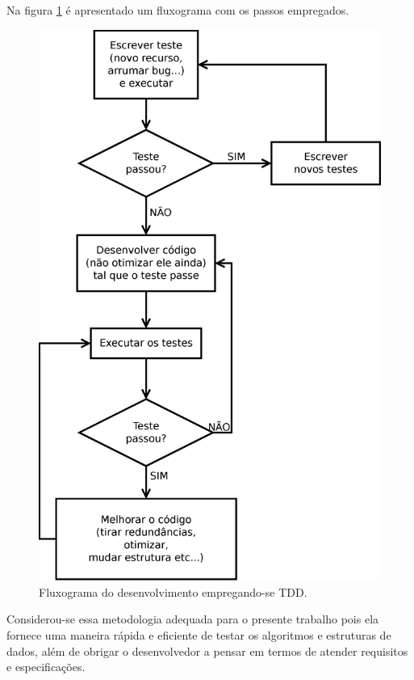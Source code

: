 Na figura \ref{fig:tdd_flow} é apresentado um fluxograma com os passos empregados.

\begin{figure}[H]
  \centering
  \includegraphics[scale=0.55]{images/diagrams/TDD_diagram}
  \caption{Fluxograma do desenvolvimento empregando-se TDD.}
  \label{fig:tdd_flow}
\end{figure}

Considerou-se essa metodologia adequada para o presente trabalho pois ela fornece uma maneira rápida e eficiente de testar os algoritmos e estruturas de dados, além de obrigar o desenvolvedor a pensar em termos de atender requisitos e especificações.


